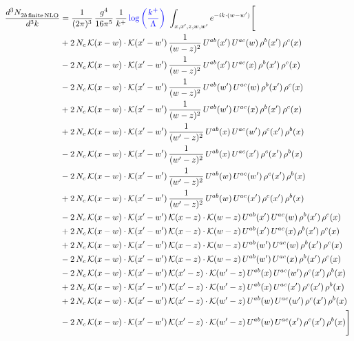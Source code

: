 \documentclass[9pt]{article}
\numberwithin{equation}{section}
\begin{document}
\begin{align}
\frac{d^{3}N_{2b\,\rm finite\, NLO}^{\rm}}{d^{3}k} & = \frac{1}{(2\pi)^{3}}\,\frac{g^{4}}{16\pi^{5}}\,\frac{1}{k^{+}}\,{\color{blue}\log{\left(\frac{k^{+}}{\Lambda}\right)}}\,\,\int_{x,x',z,w,w'}e^{-ik\cdot(w-w')}\Bigg[\notag\\ & +2\,N_{c}\,\mathcal{K}(x-w)\cdot\mathcal{K}(x'-w')\,\frac{1}{(w-z)^{2}}\,U^{ab}(x')\,U^{ac}(w)\,\rho^{b}(x')\,\rho^{c}(x)\notag\\
&-2\,N_{c}\,\mathcal{K}(x-w)\cdot\mathcal{K}(x'-w')\,\frac{1}{(w-z)^{2}}\,U^{ab}(x')\,U^{ac}(x)\,\rho^{b}(x')\,\rho^{c}(x)\notag\\
&-2\,N_{c}\,\mathcal{K}(x-w)\cdot\mathcal{K}(x'-w')\,\frac{1}{(w-z)^{2}}\,U^{ab}(w')\,U^{ac}(w)\,\rho^{b}(x')\,\rho^{c}(x)\notag\\
&+2\,N_{c}\,\mathcal{K}(x-w)\cdot\mathcal{K}(x'-w')\,\frac{1}{(w-z)^{2}}\,U^{ab}(w')\,U^{ac}(x)\,\rho^{b}(x')\,\rho^{c}(x)\notag\\
&+2\,N_{c}\,\mathcal{K}(x-w)\cdot\mathcal{K}(x'-w')\,\frac{1}{(w'-z)^{2}}\,U^{ab}(x)\,U^{ac}(w')\,\rho^{c}(x')\,\rho^{b}(x)\notag\\
&-2\,N_{c}\,\mathcal{K}(x-w)\cdot\mathcal{K}(x'-w')\,\frac{1}{(w'-z)^{2}}\,U^{ab}(x)\,U^{ac}(x')\,\rho^{c}(x')\,\rho^{b}(x)\notag\\
&-2\,N_{c}\,\mathcal{K}(x-w)\cdot\mathcal{K}(x'-w')\,\frac{1}{(w'-z)^{2}}\,U^{ab}(w)\,U^{ac}(w')\,\rho^{c}(x')\,\rho^{b}(x)\notag\\
&+2\,N_{c}\,\mathcal{K}(x-w)\cdot\mathcal{K}(x'-w')\,\frac{1}{(w'-z)^{2}}\,U^{ab}(w)\,U^{ac}(x')\,\rho^{c}(x')\,\rho^{b}(x)\notag\\
&-2\,N_{c}\,\mathcal{K}(x-w)\cdot\mathcal{K}(x'-w')\,\mathcal{K}(x-z)\cdot\mathcal{K}(w-z)\,U^{ab}(x')\,U^{ac}(w)\,\rho^{b}(x')\,\rho^{c}(x)\notag\\
&+2\,N_{c}\,\mathcal{K}(x-w)\cdot\mathcal{K}(x'-w')\,\mathcal{K}(x-z)\cdot\mathcal{K}(w-z)\,U^{ab}(x')\,U^{ac}(x)\,\rho^{b}(x')\,\rho^{c}(x)\notag\\
&+2\,N_{c}\,\mathcal{K}(x-w)\cdot\mathcal{K}(x'-w')\,\mathcal{K}(x-z)\cdot\mathcal{K}(w-z)\,U^{ab}(w')\,U^{ac}(w)\,\rho^{b}(x')\,\rho^{c}(x)\notag\\
&-2\,N_{c}\,\mathcal{K}(x-w)\cdot\mathcal{K}(x'-w')\,\mathcal{K}(x-z)\cdot\mathcal{K}(w-z)\,U^{ab}(w')\,U^{ac}(x)\,\rho^{b}(x')\,\rho^{c}(x)\notag\\
&-2\,N_{c}\,\mathcal{K}(x-w)\cdot\mathcal{K}(x'-w')\,\mathcal{K}(x'-z)\cdot\mathcal{K}(w'-z)\,U^{ab}(x)\,U^{ac}(w')\,\rho^{c}(x')\,\rho^{b}(x)\notag\\
&+2\,N_{c}\,\mathcal{K}(x-w)\cdot\mathcal{K}(x'-w')\,\mathcal{K}(x'-z)\cdot\mathcal{K}(w'-z)\,U^{ab}(x)\,U^{ac}(x')\,\rho^{c}(x')\,\rho^{b}(x)\notag\\
&+2\,N_{c}\,\mathcal{K}(x-w)\cdot\mathcal{K}(x'-w')\,\mathcal{K}(x'-z)\cdot\mathcal{K}(w'-z)\,U^{ab}(w)\,U^{ac}(w')\,\rho^{c}(x')\,\rho^{b}(x)\notag\\
&-2\,N_{c}\,\mathcal{K}(x-w)\cdot\mathcal{K}(x'-w')\,\mathcal{K}(x'-z)\cdot\mathcal{K}(w'-z)\,U^{ab}(w)\,U^{ac}(x')\,\rho^{c}(x')\,\rho^{b}(x)\Bigg]
\end{align}
\end{document}
